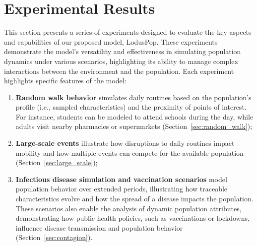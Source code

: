 \documentclass[pdflatex,sn-mathphys-num]{sn-jnl}%
\theoremstyle{thmstyleone}%
\theoremstyle{thmstyletwo}%
\theoremstyle{thmstylethree}%
\begin{document}
\section{Experimental Results}
\label{sec:results}
\label{sec:experimental_results}


This section presents a series of experiments designed to evaluate the key aspects and capabilities of our proposed model, LodusPop. These experiments demonstrate the model's versatility and effectiveness in simulating population dynamics under various scenarios, highlighting its ability to manage complex interactions between the environment and the population. Each experiment highlights specific features of the model:
\begin{enumerate}
    \item \textbf{Random walk behavior} simulates daily routines based on the population's profile (i.e., sampled characteristics) and the proximity of points of interest. For instance, students can be modeled to attend schools during the day, while adults visit nearby pharmacies or supermarkets (Section~\ref{sec:random_walk});
    \item \textbf{Large-scale events} illustrate how disruptions to daily routines impact mobility and how multiple events can compete for the available population  (Section~\ref{sec:large_scale});
    \item \textbf{Infectious disease simulation and vaccination scenarios} model population behavior over extended periods, illustrating how traceable characteristics evolve and how the spread of a disease impacts the population. These scenarios also enable the analysis of dynamic population attributes, demonstrating how public health policies, such as vaccinations or lockdowns, influence disease transmission and population behavior (Section~\ref{sec:contagion}).
\end{enumerate}
\end{document}
